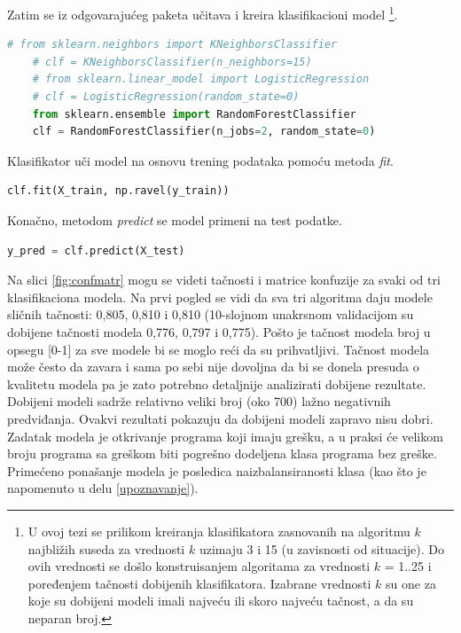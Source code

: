 \documentclass[12pt,oneside]{memoir}
\begin{document}
Zatim se iz odgovarajućeg paketa učitava i kreira klasifikacioni model \footnote{U ovoj tezi se prilikom kreiranja klasifikatora zasnovanih na algoritmu $k$ najbližih suseda za vrednosti $k$ uzimaju 3 i 15 (u zavisnosti od situacije). Do ovih vrednosti se došlo konstruisanjem algoritama za vrednosti $k$ = 1..25 i poređenjem tačnosti dobijenih klasifikatora. Izabrane vrednosti $k$ su one za koje su dobijeni modeli imali najveću ili skoro najveću tačnost, a da su neparan broj.}. 
\begin{lstlisting}[language=Python, basicstyle=\tiny]
	# from sklearn.neighbors import KNeighborsClassifier
	# clf = KNeighborsClassifier(n_neighbors=15)
	# from sklearn.linear_model import LogisticRegression
	# clf = LogisticRegression(random_state=0)
	from sklearn.ensemble import RandomForestClassifier
	clf = RandomForestClassifier(n_jobs=2, random_state=0)
\end{lstlisting}

Klasifikator uči model na osnovu trening podataka pomoću metoda \textit{fit}. 
\begin{lstlisting}[language=Python, basicstyle=\tiny]
	clf.fit(X_train, np.ravel(y_train))
\end{lstlisting}

Konačno, metodom \textit{predict} se model primeni na test podatke.
\begin{lstlisting}[language=Python, basicstyle=\tiny]
	y_pred = clf.predict(X_test)
\end{lstlisting}

Na slici \ref{fig:confmatr} mogu se videti tačnosti i matrice konfuzije za svaki od tri klasifikaciona modela. Na prvi pogled se vidi da sva tri algoritma daju modele sličnih tačnosti: 0,805, 0,810 i 0,810 (10-slojnom unakrsnom validacijom su dobijene tačnosti modela 0,776, 0,797 i 0,775). Pošto je tačnost modela broj u opsegu [0-1] za sve modele bi se moglo reći da su prihvatljivi. Tačnost modela može često da zavara i sama po sebi nije dovoljna da bi se donela presuda o kvalitetu modela pa je zato potrebno detaljnije analizirati dobijene rezultate. Dobijeni modeli sadrže relativno veliki broj (oko 700) lažno negativnih predviđanja. Ovakvi rezultati pokazuju da dobijeni modeli zapravo nisu dobri. Zadatak modela je otkrivanje programa koji imaju grešku, a u praksi će velikom broju programa sa greškom biti pogrešno dodeljena klasa programa bez greške. Primećeno ponašanje modela je posledica naizbalansiranosti klasa (kao što je napomenuto u delu \ref{upoznavanje}). 
\end{document}
